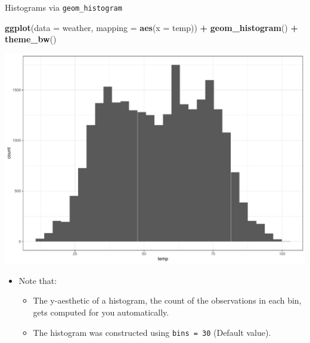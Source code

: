 \documentclass[
  ignorenonframetext,
]{beamer}
\newenvironment{Shaded}{\begin{snugshade}}{\end{snugshade}}
\newcommand{\AttributeTok}[1]{\textcolor[rgb]{0.13,0.29,0.53}{#1}}
\newcommand{\FunctionTok}[1]{\textcolor[rgb]{0.13,0.29,0.53}{\textbf{#1}}}
\newcommand{\NormalTok}[1]{#1}
\newcommand{\SpecialCharTok}[1]{\textcolor[rgb]{0.81,0.36,0.00}{\textbf{#1}}}
\providecommand{\tightlist}{%
  \setlength{\itemsep}{0pt}\setlength{\parskip}{0pt}}
\begin{document}
\begin{frame}[fragile]{Histograms via \texttt{geom\_histogram}}
\protect\hypertarget{histograms-via-geom_histogram}{}
\tiny

\begin{Shaded}
\begin{Highlighting}[]
\FunctionTok{ggplot}\NormalTok{(}\AttributeTok{data =}\NormalTok{ weather, }\AttributeTok{mapping =} \FunctionTok{aes}\NormalTok{(}\AttributeTok{x =}\NormalTok{ temp)) }\SpecialCharTok{+}
  \FunctionTok{geom\_histogram}\NormalTok{() }\SpecialCharTok{+}
  \FunctionTok{theme\_bw}\NormalTok{()}
\end{Highlighting}
\end{Shaded}

\begin{center}\includegraphics[width=0.7\linewidth,height=0.5\textheight]{Week2_Lect_files/figure-beamer/unnamed-chunk-25-1} \end{center}
\normalsize

\begin{itemize}
\item
  Note that:

  \begin{itemize}
  \tightlist
  \item
    The y-aesthetic of a histogram, the count of the observations in
    each bin, gets computed for you automatically.
  \item
    The histogram was constructed using \texttt{bins\ =\ 30} (Default
    value).
  \end{itemize}
\end{itemize}
\end{frame}
\end{document}
